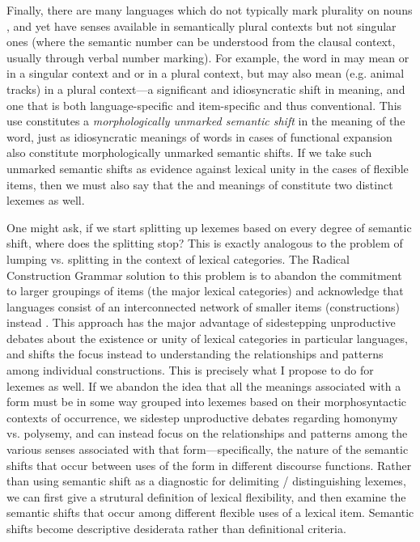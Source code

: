 Finally, there are many languages which do not typically mark plurality on nouns \parencite{Dryer2013}, and yet have senses available in semantically plural contexts but not singular ones (where the semantic number can be understood from the clausal context, usually through verbal number marking). For example, the word  in  may mean  or  in a singular context and  or  in a plural context, but may also mean  (e.g. animal tracks) in a plural context—a significant and idiosyncratic shift in meaning, and one that is both language-specific and item-specific and thus conventional. This use constitutes a \emph{morphologically unmarked semantic shift} in the meaning of the word, just as idiosyncratic meanings of words in cases of functional expansion also constitute morphologically unmarked semantic shifts. If we take such unmarked semantic shifts as evidence against lexical unity in the cases of flexible items, then we must also say that the  and  meanings of  constitute two distinct lexemes as well.

One might ask, if we start splitting up lexemes based on every degree of semantic shift, where does the splitting stop? This is exactly analogous to the problem of lumping vs. splitting in the context of lexical categories. The Radical Construction Grammar solution to this problem is to abandon the commitment to larger groupings of items (the major lexical categories) and acknowledge that languages consist of an interconnected network of smaller items (constructions) instead \parencite{Croft2001b}. This approach has the major advantage of sidestepping unproductive debates about the existence or unity of lexical categories in particular languages, and shifts the focus instead to understanding the relationships and patterns among individual constructions. This is precisely what I propose to do for lexemes as well. If we abandon the idea that all the meanings associated with a form must be in some way grouped into lexemes based on their morphosyntactic contexts of occurrence, we sidestep unproductive debates regarding homonymy vs. polysemy, and can instead focus on the relationships and patterns among the various senses associated with that form—specifically, the nature of the semantic shifts that occur between uses of the form in different discourse functions. Rather than using semantic shift as a diagnostic for delimiting / distinguishing lexemes, we can first give a strutural definition of lexical flexibility, and then examine the semantic shifts that occur among different flexible uses of a lexical item. Semantic shifts become descriptive desiderata rather than definitional criteria.

